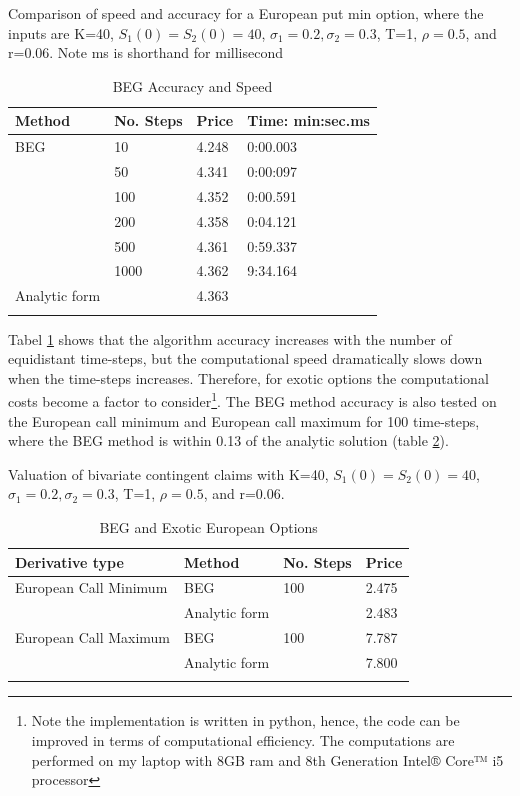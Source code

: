 \begin{table}[th]
\caption{BEG Accuracy and Speed}{Comparison of speed and accuracy for a European put min option, where the inputs are K=40, $S_1(0)=S_2(0)=40$, $\sigma_1=0.2, \sigma_2=0.3$, T=1, $\rho=0.5$,  and r=0.06. Note ms is shorthand for millisecond}
\label{tab:TradeOffEuroMin}
\centering
\begin{tabular}{l l l l}
\toprule
\textbf{Method} & \textbf{No. Steps} & \textbf{Price} & \textbf{Time: min:sec.ms} \\
\midrule
BEG & 10 & 4.248 & 0:00.003\\
& 50 & 4.341 & 0:00:097\\
& 100 & 4.352 & 0:00.591\\
& 200 & 4.358 & 0:04.121\\
& 500 & 4.361 & 0:59.337\\
& 1000 & 4.362 & 9:34.164\\
Analytic form & & 4.363 & \\
\bottomrule\\
\end{tabular}
\end{table}
Tabel \ref{tab:TradeOffEuroMin} shows that the algorithm accuracy increases with the number of equidistant time-steps, but the computational speed dramatically slows down when the time-steps increases. Therefore, for exotic options the computational costs become a factor to consider\footnote{Note the implementation is written in python, hence, the code can be improved in terms of computational efficiency. The computations are performed on my laptop with 8GB ram and 8th Generation Intel® Core™ i5 processor}. The BEG method accuracy is also tested on the European call minimum and European call maximum for 100 time-steps, where the BEG method is within 0.13 of the analytic solution (table \ref{tab:PriceEuropean}).\\
\begin{table}[th]
\caption{BEG and Exotic European Options}{Valuation of bivariate contingent claims with K=40, $S_1(0)=S_2(0)=40$, $\sigma_1=0.2, \sigma_2=0.3$, T=1, $\rho=0.5$,  and r=0.06.}
\label{tab:PriceEuropean}
\centering
\begin{tabular}{l l l l}
\toprule
\textbf{Derivative type} & \textbf{Method} & \textbf{No. Steps} & \textbf{Price} \\
\midrule
European Call Minimum & BEG & 100 & 2.475\\
& Analytic form & & 2.483\\
European Call Maximum & BEG & 100 & 7.787\\
& Analytic form & & 7.800\\
\bottomrule\\
\end{tabular}
\end{table}
 
